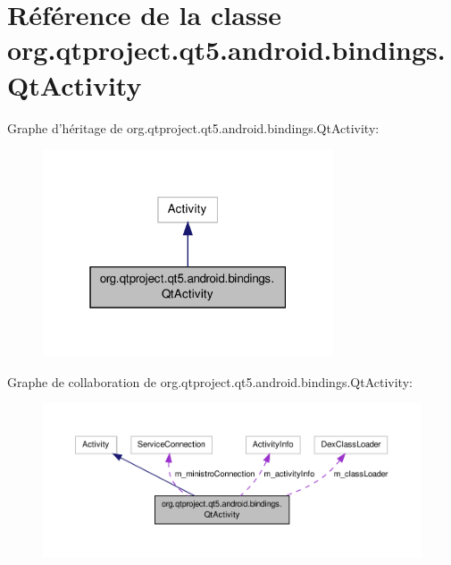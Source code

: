 \hypertarget{classorg_1_1qtproject_1_1qt5_1_1android_1_1bindings_1_1_qt_activity}{\section{Référence de la classe org.\-qtproject.\-qt5.\-android.\-bindings.\-Qt\-Activity}
\label{classorg_1_1qtproject_1_1qt5_1_1android_1_1bindings_1_1_qt_activity}
}


Graphe d'héritage de org.\-qtproject.\-qt5.\-android.\-bindings.\-Qt\-Activity\-:\nopagebreak
\begin{figure}[H]
\begin{center}
\leavevmode
\includegraphics[width=244pt]{classorg_1_1qtproject_1_1qt5_1_1android_1_1bindings_1_1_qt_activity__inherit__graph}
\end{center}
\end{figure}


Graphe de collaboration de org.\-qtproject.\-qt5.\-android.\-bindings.\-Qt\-Activity\-:\nopagebreak
\begin{figure}[H]
\begin{center}
\leavevmode
\includegraphics[width=350pt]{classorg_1_1qtproject_1_1qt5_1_1android_1_1bindings_1_1_qt_activity__coll__graph}
\end{center}
\end{figure}
